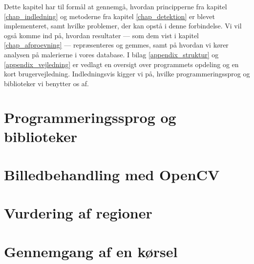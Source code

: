 {
{\sffamily Dette kapitel har til formål at gennemgå, hvordan
principperne fra kapitel \ref{chap_indledning} og metoderne fra kapitel
\ref{chap_detektion} er blevet implementeret, samt hvilke problemer, der
kan opstå i denne forbindelse. Vi vil også komme ind på, hvordan
resultater --- som dem vist i kapitel \ref{chap_afproevning} ---
repræsenteres og gemmes, samt på hvordan vi kører analysen på malerierne
i vores database. I bilag \ref{appendix_struktur} og
\ref{appendix_vejledning} er vedlagt en oversigt over programmets
opdeling og en kort brugervejledning.  Indledningsvis kigger vi på,
hvilke programmeringssprog og biblioteker vi benytter os af.
}

\section{Programmeringssprog og biblioteker\label{section_programmeringssprog}}


\section{Billedbehandling med OpenCV\label{section_impBilledbehandling}}


\section{Vurdering af regioner\label{section_vurdering_regioner}}


\section{Gennemgang af en kørsel\label{section_koersel}}


%

}

